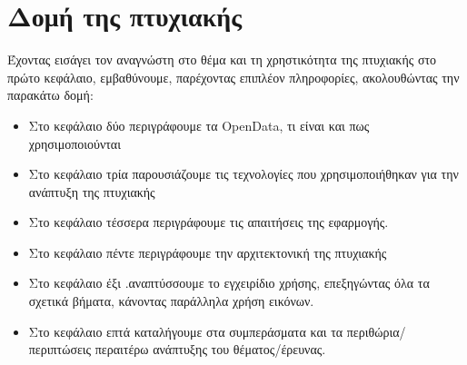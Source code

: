 \section{Δομή της πτυχιακής}
Έχοντας εισάγει τον αναγνώστη στο θέμα και τη χρηστικότητα της πτυχιακής στο πρώτο κεφάλαιο, εμβαθύνουμε, παρέχοντας επιπλέον πληροφορίες, ακολουθώντας την παρακάτω δομή: 
\begin{itemize}
    \item Στο κεφάλαιο δύο περιγράφουμε τα OpenData, τι είναι και πως χρησιμοποιούνται
    \item Στο κεφάλαιο τρία παρουσιάζουμε τις τεχνολογίες που χρησιμοποιήθηκαν για την ανάπτυξη της πτυχιακής
    \item Στο κεφάλαιο τέσσερα περιγράφουμε τις απαιτήσεις της εφαρμογής.
    \item Στο κεφάλαιο πέντε περιγράφουμε την αρχιτεκτονική της πτυχιακής
    \item Στο κεφάλαιο έξι .αναπτύσσουμε το εγχειρίδιο χρήσης, επεξηγώντας όλα τα σχετικά βήματα, κάνοντας παράλληλα χρήση εικόνων.
    \item Στο κεφάλαιο επτά καταλήγουμε στα συμπεράσματα και τα περιθώρια/περιπτώσεις περαιτέρω ανάπτυξης του θέματος/έρευνας.
\end{itemize}